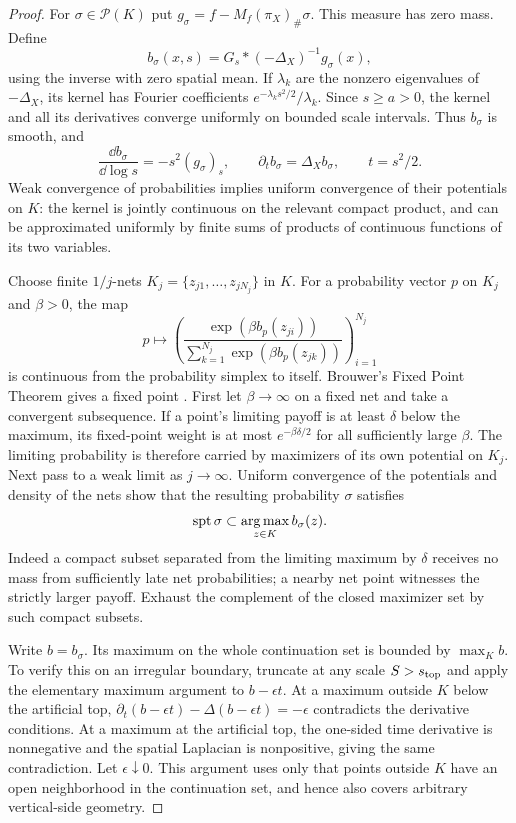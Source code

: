 \begin{proof}
For $\sigma\in\mathcal P(K)$ put
$g_\sigma=f-M_f(\pi_X)_\#\sigma$.  This measure has zero mass.  Define
\[
 b_\sigma(x,s)=G_s*(-\Delta_X)^{-1}g_\sigma(x),
\]
using the inverse with zero spatial mean.  If $\lambda_k$ are the
nonzero eigenvalues of $-\Delta_X$, its kernel has Fourier coefficients
$e^{-\lambda_k s^2/2}/\lambda_k$.  Since $s\ge a>0$, the kernel and all
its derivatives converge uniformly on bounded scale intervals.  Thus
$b_\sigma$ is smooth, and
\begin{equation}\label{ct:potential-derivative}
 \frac{\dd b_\sigma}{\dd\log s}=-s^2(g_\sigma)_s,
 \qquad \partial_t b_\sigma=\Delta_X b_\sigma,
 \qquad t=s^2/2.
\end{equation}
Weak convergence of probabilities implies uniform convergence of their
potentials on $K$: the kernel is jointly continuous on the relevant
compact product, and can be approximated uniformly by finite sums of
products of continuous functions of its two variables.

Choose finite $1/j$-nets $K_j=\{z_{j1},\ldots,z_{jN_j}\}$ in $K$.
For a probability vector $p$ on $K_j$ and $\beta>0$, the map
\[
 p\longmapsto
 \left(\frac{\exp(\beta b_p(z_{ji}))}
 {\sum_{k=1}^{N_j}\exp(\beta b_p(z_{jk}))}\right)_{i=1}^{N_j}
\]
is continuous from the probability simplex to itself.  Brouwer's Fixed
Point Theorem gives a fixed point \cite[Theorem~2]{Milnor1978}.  First let $\beta\to\infty$ on a
fixed net and take a convergent subsequence.  If a point's limiting
payoff is at least $\delta$ below the maximum, its fixed-point weight is
at most $e^{-\beta\delta/2}$ for all sufficiently large $\beta$.
The limiting probability is therefore carried by maximizers of its own
potential on $K_j$.  Next pass to a weak limit as $j\to\infty$.
Uniform convergence of the potentials and density of the nets show that
the resulting probability $\sigma$ satisfies
\begin{equation}\label{ct:self-maximizers}
 \operatorname{spt}\sigma\subset\operatorname*{arg\,max}_{z\in K}b_\sigma(z).
\end{equation}
Indeed a compact subset separated from the limiting maximum by $\delta$
receives no mass from sufficiently late net probabilities; a nearby net
point witnesses the strictly larger payoff.  Exhaust the complement of
the closed maximizer set by such compact subsets.

Write $b=b_\sigma$.  Its maximum on the whole continuation set is
bounded by $\max_K b$.  To verify this on an irregular boundary, truncate
at any scale $S>s_{\rm top}$ and apply the elementary maximum argument to
$b-\epsilon t$.  At a maximum outside $K$ below the artificial top,
$\partial_t(b-\epsilon t)-\Delta(b-\epsilon t)=-\epsilon$ contradicts
the derivative conditions.  At a maximum at the artificial top, the
one-sided time derivative is nonnegative and the spatial Laplacian is
nonpositive, giving the same contradiction.  Let $\epsilon\downarrow0$.
This argument uses only that points outside $K$ have an open
neighborhood in the continuation set, and hence also covers arbitrary
vertical-side geometry.


\end{proof}
